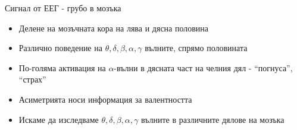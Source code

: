 \documentclass[9pt]{beamer}
\begin{document}
    \begin{frame}[t]{Сигнал от ЕЕГ - грубо в мозъка}
        \begin{itemize}
            \setlength\itemsep{\fill}
            \pause
            \item Делене на мозъчната кора на лява и дясна половина
            \pause
            \item  Различно поведение на $\theta, \delta, \beta, \alpha, \gamma$ вълните, спрямо половината
            \pause
            \item По-голяма активация на $\alpha$-вълни в дясната част на челния дял - ``погнуса'', ``страх''
            \pause
            \item Асиметрията носи информация за валентността
        \end{itemize}
        \pause 
        \begin{itemize}
            \pause
            \item Искаме да изследваме $\theta, \delta, \beta, \alpha, \gamma$ вълните в различните дялове на мозъка
        \end{itemize}
    \end{frame}
\end{document}
